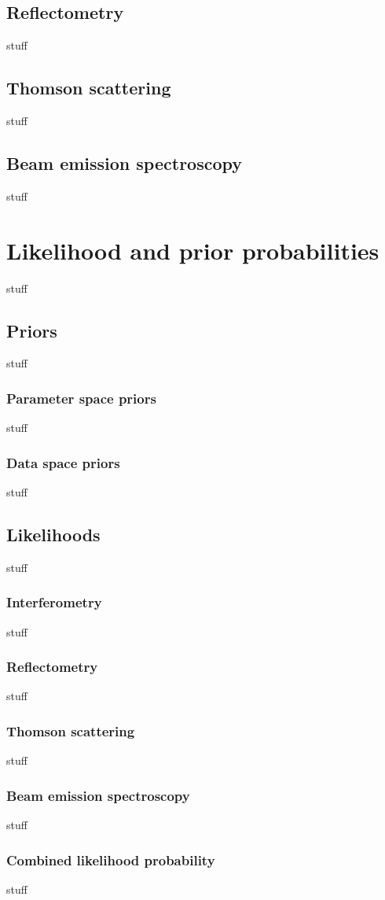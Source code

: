 \documentclass	[12pt]{article}
\begin{document}
\subsection{Reflectometry}
stuff
\subsection{Thomson scattering}
stuff
\subsection{Beam emission spectroscopy}
stuff
\section{Likelihood and prior probabilities}
stuff
\subsection{Priors}
stuff
\subsubsection{Parameter space priors}
stuff
\subsubsection{Data space priors}
stuff
\subsection{Likelihoods}
stuff
\subsubsection{Interferometry}
stuff
\subsubsection{Reflectometry}
stuff
\subsubsection{Thomson scattering}
stuff
\subsubsection{Beam emission spectroscopy}
stuff
\subsubsection{Combined likelihood probability}
stuff
\end{document}
